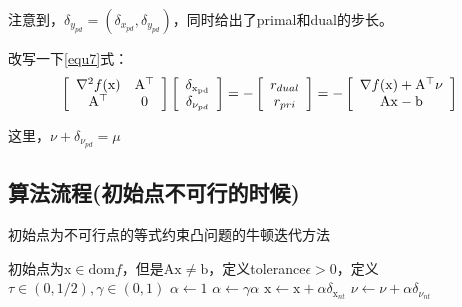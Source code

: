 \documentclass[a4paper]{D:/MyRepo/Script/latex/PaperReadingLog}
\begin{document}
注意到，$\delta_{y_{pd}}=(\delta_{x_{pd}},\delta_{y_{pd}})$，同时给出了primal和dual的步长。

改写一下\ref{equ7}式：
\begin{equation}
    \label{equ8}
    \left[
\begin{array}[]{cc}
    \nabla^2 f(\mathrm{x}) & \mathrm{A}^\top \\
    \mathrm{A}^\top & 0
\end{array}
\right]
\left[
\begin{array}[]{c}
    \delta_\mathrm{x_{pd}}\\
    \delta_{\nu_{pd}}
\end{array}
\right]
=-
\left[
\begin{array}[]{c}
  r_{dual}\\
  r_{pri}  
\end{array}
\right]
=-
\left[
\begin{array}[]{c}
    \nabla f(\mathrm{x})+\mathrm{A}^\top\nu\\
    \mathrm{A}\mathrm{x}-\mathrm{b}
\end{array}
\right]
\end{equation}

这里，$\nu+\delta_{\nu_{pd}}=\mu$

\subsection{算法流程(初始点不可行的时候)}
\begin{algorithm}[H]
	\caption{初始点为不可行点的等式约束凸问题的牛顿迭代方法} 
	\begin{algorithmic}[1]
		\STATE 初始点为$\mathrm{x}\in\mathrm{dom} f$，但是$\mathrm{A}\mathrm{x}\neq\mathrm{b}$，定义tolerance$\epsilon>0$，定义$\tau\in(0,1/2),\gamma\in(0,1)$
            \STATE {}
            \STATE {}
            \STATE $\alpha\leftarrow 1$
             \STATE $\alpha\leftarrow\gamma\alpha$
        \ENDWHILE
        \STATE $\mathrm{x}\leftarrow\mathrm{x}+\alpha\delta_{\mathrm{x}_{nt}}$
        \STATE $\nu\leftarrow\nu+\alpha\delta_{\nu_{nt}}$
        \ENDWHILE
	\end{algorithmic}
\end{algorithm}
\end{document}
